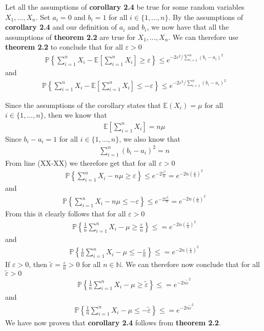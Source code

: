Let all the assumptions of \textbf{corollary 2.4} be true for some random variables $X_1, ..., X_n$. Set $a_i = 0$ and $b_i=1$ for all $i \in \{1, ..., n\}$. By the assumptions of \textbf{corollary 2.4} and our definition of $a_i$ and $b_i$, we now have that all the assumptions of \textbf{theorem 2.2} are true for $X_1, ..., X_n$. We can therefore use \textbf{theorem 2.2} to conclude that for all $\varepsilon >0$
\begin{align}
\mathbb{P}\left\{ \sum_{i=1}^n X_i - \mathbb{E}\left[ \sum_{i=1}^n X_i \right] \geq \varepsilon \right\} \leq e^{-2 \varepsilon^2 / \sum_{i=1}^n (b_i - a_i)^2}
\end{align}
and
\begin{align}
\mathbb{P}\left\{ \sum_{i=1}^n X_i - \mathbb{E}\left[ \sum_{i=1}^n X_i \right] \leq - \varepsilon \right\} \leq e^{-2 \varepsilon^2 / \sum_{i=1}^n (b_i - a_i)^2}
\end{align}

Since the assumptions of the corollary states that $\mathbb{E}(X_i) = \mu$ for all $i \in \{1, ..., n\}$, then we know that 
\begin{align}
\mathbb{E}\left[ \sum_{i=1}^n X_i \right] = n\mu 
\end{align}
Since $b_i - a_i = 1$ for all $i \in \{1, ..., n\}$, we also know that
\begin{align}
\sum_{i=1}^n (b_i - a_i)^2 = n 
\end{align}
From line (XX-XX) we therefore get that for all $\varepsilon > 0$
\begin{align}
\mathbb{P}\left\{ \sum_{i=1}^n X_i - n\mu \geq \varepsilon \right\} \leq e^{- 2 \frac{\varepsilon^2}{n} } = e^{- 2n \left( \frac{ \varepsilon}{n} \right)^2 }
\end{align}
and
\begin{align}
\mathbb{P}\left\{ \sum_{i=1}^n X_i - n\mu \leq -\varepsilon \right\} \leq e^{- 2 \frac{\varepsilon^2}{n} } = e^{- 2n \left( \frac{ \varepsilon}{n} \right)^2 }
\end{align}
From this it clearly follows that for all $\varepsilon > 0$
\begin{align}
\mathbb{P}\left\{\frac{1}{n} \sum_{i=1}^n X_i - \mu \geq \frac{\varepsilon}{n} \right\} \leq = e^{- 2n \left( \frac{ \varepsilon}{n} \right)^2 }
\end{align}
and
\begin{align}
\mathbb{P}\left\{\frac{1}{n} \sum_{i=1}^n X_i - \mu \leq- \frac{\varepsilon}{n} \right\} \leq = e^{- 2n \left( \frac{ \varepsilon}{n} \right)^2 }
\end{align}
If $\varepsilon > 0$, then $\tilde{\varepsilon} = \frac{\varepsilon}{n} > 0$ for all $n\in \mathbb{N}$. We can therefore now conclude that for all $\tilde{\varepsilon}>0$
\begin{align}
\mathbb{P}\left\{\frac{1}{n} \sum_{i=1}^n X_i - \mu \geq \tilde{\varepsilon} \right\} \leq = e^{- 2n \tilde{\varepsilon}^2 }
\end{align}
and
\begin{align}
\mathbb{P}\left\{\frac{1}{n} \sum_{i=1}^n X_i - \mu \leq - \tilde{\varepsilon} \right\} \leq = e^{- 2n \tilde{\varepsilon}^2 }
\end{align}
We have now proven that \textbf{corollary 2.4} follows from \textbf{theorem 2.2}.
